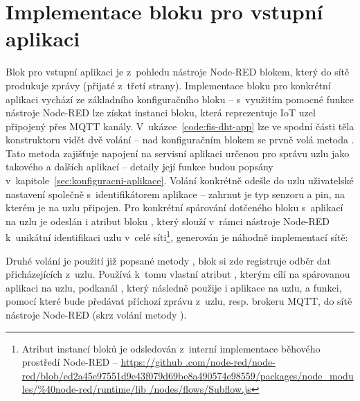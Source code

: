 \section{Implementace bloku pro vstupní aplikaci}\label{sec:implementace-bloku-pro-vstupni-aplikaci}
Blok pro vstupní aplikaci je z~pohledu nástroje Node-RED blokem, který do sítě produkuje zprávy (přijaté z~třetí
strany).
Implementace bloku pro konkrétní aplikaci vychází ze základního konfiguračního bloku -- s~využitím pomocné funkce
nástroje Node-RED \mbox{} lze získat instanci bloku, která reprezentuje IoT uzel připojený přes
MQTT kanály. 
V~ukázce~\ref{code:fis-dht-app} lze ve spodní části těla konstruktoru vidět dvě volání -- nad konfiguračním blokem se
prvně volá metoda .
Tato metoda zajišťuje napojení na servisní aplikaci určenou pro správu uzlu jako takového a dalších aplikací --
detaily její funkce budou popsány v~kapitole~\ref{sec:konfiguracni-aplikace}.
Volání konkrétně odešle do uzlu uživatelské nastavení společně s~identifikátorem aplikace  -- zahrnut
je typ senzoru a pin, na kterém je na uzlu připojen.
Pro konkrétní spárování dotčeného bloku s~aplikací na uzlu je odeslán i atribut bloku , který slouží
v~rámci nástroje Node-RED k~unikátní identifikaci uzlu v~celé síti\footnote{Atribut  instancí bloků je
odsledován z~interní implementace běhového prostředí Node-RED -- \url{https://github
.com/node-red/node-red/blob/ed2a45e97551d9e43f079d69be8a490574e98559/packages/node_modules/\%40node-red/runtime/lib
/nodes/flows/Subflow.js}}, generován je náhodně implementací sítě:

Druhé volání je použití již popsané metody , blok si zde registruje odběr dat přicházejících
z~uzlu.
Používá k~tomu vlastní atribut , kterým cílí na spárovanou aplikaci na uzlu, podkanál , který
následně použije i aplikace na uzlu, a funkci, pomocí které bude předávat příchozí zprávu z~uzlu, resp. brokeru MQTT,
do sítě nástroje Node-RED (skrz volání metody ).

